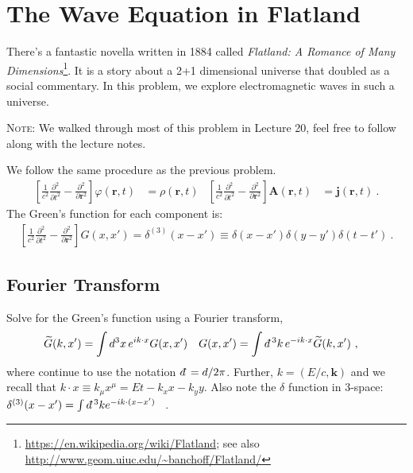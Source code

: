 \documentclass[12pt]{article}
\numberwithin{equation}{section}    %
\renewcommand{\tilde}{\widetilde}   %
\renewcommand{\vec}[1]{\mathbf{#1}} %
\newcommand{\dbar}{d\mkern-6mu\mathchar'26}    %
\begin{document}
 





\section{The Wave Equation in Flatland}

There's a fantastic novella written in 1884 called \emph{Flatland: A Romance of Many Dimensions}\footnote{\url{https://en.wikipedia.org/wiki/Flatland}; see also \url{http://www.geom.uiuc.edu/~banchoff/Flatland/}}. It is a story about a 2+1 dimensional universe that doubled as a social commentary. In this problem, we explore electromagnetic waves in such a universe. 

\textsc{Note}: We walked through most of this problem in Lecture 20, feel free to follow along with the lecture notes.


We follow the same procedure as the previous problem.
\begin{align}
	\left[\frac{1}{c^2}\frac{\partial^2}{\partial t^2} - \frac{\partial^2}{\partial \vec{r}^2}\right] 
	\varphi(\vec{r},t) &= \rho(\vec{r},t)
	&
	\left[\frac{1}{c^2}\frac{\partial^2}{\partial t^2} - \frac{\partial^2}{\partial \vec{r}^2}\right]
	\vec A(\vec{r},t) &= \vec j(\vec{r},t) \ .
	\label{eq:EM:wave}
\end{align}
The Green's function for each component is:
\begin{align}
	\left[\frac{1}{c^2}\frac{\partial^2}{\partial t^2} - \frac{\partial^2}{\partial \vec{r}^2}\right] G(x,x') = \delta^{(3)}(x-x') \equiv \delta(x-x')\delta(y-y')\delta(t-t') \ .
	\label{eq:HO:in:3d}
\end{align}

\subsection{Fourier Transform}

Solve for the Green's function using a Fourier transform,
\begin{align}
	\tilde G(k,x') &= \int d^3x \, e^{ik\cdot x} G(x,x')
	&
	G(x,x') &= \int \dbar^3k \, e^{-ik\cdot x} \tilde G(k,x') \ ,
\end{align}
where continue to use the notation $\dbar = d/2\pi$. Further, $k = (E/c,\vec k)$ and we recall that $k\cdot x \equiv k_\mu x^\mu = Et - k_x x - k_y y$. Also note the $\delta$ function in 3-space: $\delta^{(3)}(x-x') = \int \dbar^3 k e^{-ik\cdot (x-x')}$ \ .
\end{document}
